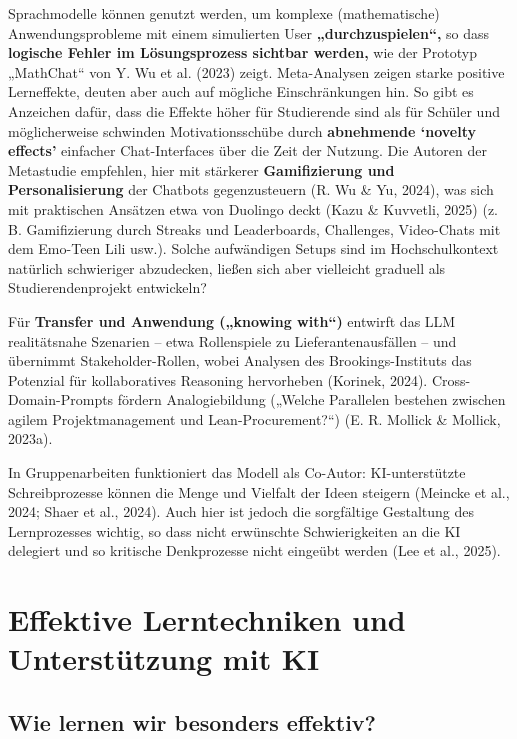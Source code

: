 \documentclass[
  ngerman,
  letterpaper,
  DIV=11]{scrreprt}
\begin{document}
Sprachmodelle können genutzt werden, um komplexe (mathematische)
Anwendungsprobleme mit einem simulierten User
\textbf{„durchzuspielen``,} so dass \textbf{logische Fehler im
Lösungsprozess sichtbar werden,} wie der Prototyp „MathChat`` von Y. Wu
et al. (2023) zeigt. Meta-Analysen zeigen starke positive Lerneffekte,
deuten aber auch auf mögliche Einschränkungen hin. So gibt es Anzeichen
dafür, dass die Effekte höher für Studierende sind als für Schüler und
möglicherweise schwinden Motivationsschübe durch \textbf{abnehmende
`novelty effects'} einfacher Chat-Interfaces über die Zeit der Nutzung.
Die Autoren der Metastudie empfehlen, hier mit stärkerer
\textbf{Gamifizierung und Personalisierung} der Chatbots gegenzusteuern
(R. Wu \& Yu, 2024), was sich mit praktischen Ansätzen etwa von Duolingo
deckt (Kazu \& Kuvvetli, 2025) (z. B. Gamifizierung durch Streaks und
Leaderboards, Challenges, Video-Chats mit dem Emo-Teen Lili usw.).
Solche aufwändigen Setups sind im Hochschulkontext natürlich schwieriger
abzudecken, ließen sich aber vielleicht graduell als Studierendenprojekt
entwickeln?

Für \textbf{Transfer und Anwendung („knowing with``)} entwirft das LLM
realitätsnahe Szenarien -- etwa Rollenspiele zu Lieferantenausfällen --
und übernimmt Stakeholder-Rollen, wobei Analysen des Brookings-Instituts
das Potenzial für kollaboratives Reasoning hervorheben (Korinek, 2024).
Cross-Domain-Prompts fördern Analogiebildung („Welche Parallelen
bestehen zwischen agilem Projektmanagement und Lean-Procurement?{}``)
(E. R. Mollick \& Mollick, 2023a).

In Gruppenarbeiten funktioniert das Modell als Co-Autor: KI-unterstützte
Schreibprozesse können die Menge und Vielfalt der Ideen steigern
(Meincke et al., 2024; Shaer et al., 2024). Auch hier ist jedoch die
sorgfältige Gestaltung des Lernprozesses wichtig, so dass nicht
erwünschte Schwierigkeiten an die KI delegiert und so kritische
Denkprozesse nicht eingeübt werden (Lee et al., 2025).

\section{Effektive Lerntechniken und Unterstützung mit
KI}\label{sec-lerntechniken}

\subsection{Wie lernen wir besonders
effektiv?}\label{wie-lernen-wir-besonders-effektiv}
\end{document}
